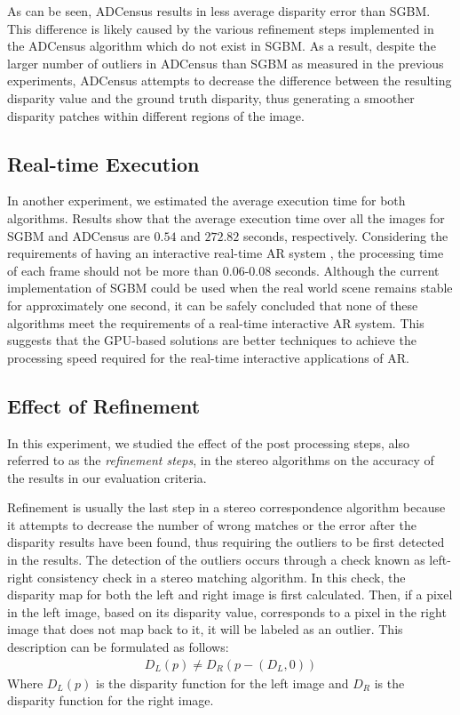 As can be seen, ADCensus results in less average disparity error than SGBM. This difference is likely caused by the various refinement steps
implemented in the ADCensus algorithm which do not exist in SGBM.
As a result, despite the larger number of outliers in ADCensus than SGBM as measured in the previous experiments,
ADCensus attempts to decrease the difference between the resulting disparity value and the ground truth disparity, thus generating a smoother disparity patches
within different regions of the image.

\subsection{Real-time Execution}
In another experiment, we estimated the average execution time for both algorithms. Results show that the average execution time over all the images 
for SGBM and ADCensus are $0.54$ and $272.82$ seconds, respectively.
Considering the requirements of having an interactive real-time AR system \cite{hertz00}, the processing time of each frame should not be more than 0.06-0.08 seconds.
Although the current implementation of SGBM could be used when the real world scene remains stable for approximately one second, it can be safely concluded that
none of these algorithms meet the requirements of a real-time interactive AR system.
This suggests that the GPU-based solutions are better techniques to achieve the processing speed required for the real-time 
interactive applications of AR.

\subsection{Effect of Refinement}
In this experiment, we studied the effect of the post processing steps, also referred to as the \textit{refinement steps}, 
in the stereo algorithms on the accuracy of the results in our evaluation criteria. 

Refinement is usually the last step in a stereo correspondence algorithm because it attempts to decrease the 
number of wrong matches or the error after the disparity results have been found, thus requiring the outliers to be first detected in the results. 
The detection of the outliers occurs through a check known as left-right consistency check in a stereo matching algorithm. In this check, the disparity map for both
the left and right image is first calculated. Then, if a pixel in the left image, based on its disparity value, corresponds to a pixel in the right image
that does not map back to it, it will be labeled as an outlier. This description can be formulated as follows:
\begin{align}
D_{L}(p) \neq D_{R}(p-(D_{L},0))
\end{align}
\noindent
Where $D_{L}(p)$ is the disparity function for the left image and $D_{R}$ is the disparity function for the right image.

